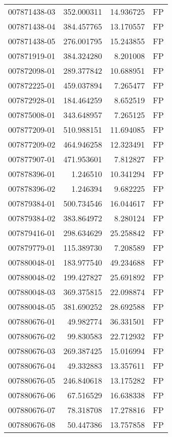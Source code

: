 \begin{tabular}{lrrl}
007871438-03 &  352.000311 &    14.936725 &   FP \\
007871438-04 &  384.457765 &    13.170557 &   FP \\
007871438-05 &  276.001795 &    15.243855 &   FP \\
007871919-01 &  384.324280 &     8.201008 &   FP \\
007872098-01 &  289.377842 &    10.688951 &   FP \\
007872225-01 &  459.037894 &     7.265477 &   FP \\
007872928-01 &  184.464259 &     8.652519 &   FP \\
007875008-01 &  343.648957 &     7.265125 &   FP \\
007877209-01 &  510.988151 &    11.694085 &   FP \\
007877209-02 &  464.946258 &    12.323491 &   FP \\
007877907-01 &  471.953601 &     7.812827 &   FP \\
007878396-01 &    1.246510 &    10.341294 &   FP \\
007878396-02 &    1.246394 &     9.682225 &   FP \\
007879384-01 &  500.734546 &    16.044617 &   FP \\
007879384-02 &  383.864972 &     8.280124 &   FP \\
007879416-01 &  298.634629 &    25.258842 &   FP \\
007879779-01 &  115.389730 &     7.208589 &   FP \\
007880048-01 &  183.977540 &    49.234688 &   FP \\
007880048-02 &  199.427827 &    25.691892 &   FP \\
007880048-03 &  369.375815 &    22.098874 &   FP \\
007880048-05 &  381.690252 &    28.692588 &   FP \\
007880676-01 &   49.982774 &    36.331501 &   FP \\
007880676-02 &   99.830583 &    22.712932 &   FP \\
007880676-03 &  269.387425 &    15.016994 &   FP \\
007880676-04 &   49.332883 &    13.357611 &   FP \\
007880676-05 &  246.840618 &    13.175282 &   FP \\
007880676-06 &   67.516529 &    16.638338 &   FP \\
007880676-07 &   78.318708 &    17.278816 &   FP \\
007880676-08 &   50.447386 &    13.757858 &   FP \\

\end{tabular}
